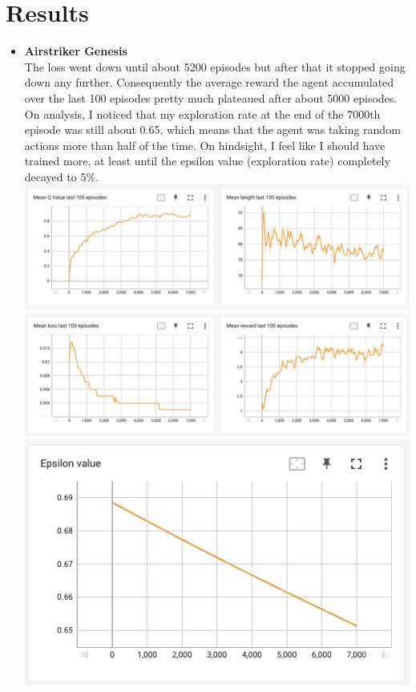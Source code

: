 \documentclass[paper=a4, fontsize=11pt, margin=1in]{scrartcl}
\numberwithin{equation}{section}		%
\numberwithin{figure}{section}			%
\numberwithin{table}{section}				%
\begin{document}
\pagebreak
\section{Results}

\begin{itemize}
    \item \textbf{Airstriker Genesis}\\
    The loss went down until about 5200 episodes but after that it stopped going down any further. Consequently the average reward the agent accumulated over the last 100 episodes pretty much plateaued after about 5000 episodes. On analysis, I noticed that my exploration rate at the end of the 7000th episode was still about 0.65, which means that the agent was taking random actions more than half of the time. On hindsight, I feel like I should have trained more, at least until the epsilon value (exploration rate) completely decayed to 5\%.\\ 
    
    \includegraphics[scale=0.4]{air1.png}
    \includegraphics[scale=0.4]{air2.png}
    \includegraphics[scale=0.4]{air3.png}\\\\


\end{itemize}
\end{document}

